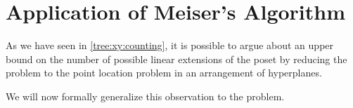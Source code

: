\chapter{Application of Meiser's Algorithm}

As we have seen in \ref{tree:xy:counting}, it is possible to argue about an upper
bound on the number of possible linear extensions of the poset \XY by
reducing the problem to the point location problem in an
arrangement of hyperplanes.

We will now formally generalize this observation to the \kSUM problem.
